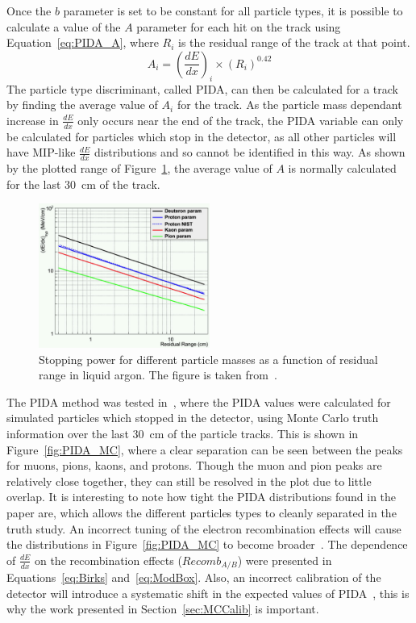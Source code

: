 Once the $b$ parameter is set to be constant for all particle types, it is possible to calculate a value of the $A$ parameter for each hit on the track using Equation~\ref{eq:PIDA_A}, where $R_i$ is the residual range of the track at that point.
\begin{equation}
  \label{eq:PIDA_A}
  A_i = \left(\frac{dE}{dx}\right)_i \times \left(R_{i}\right)^{0.42}
\end{equation}
The particle type discriminant, called PIDA, can then be calculated for a track by finding the average value of $A_i$ for the track. As the particle mass dependant increase in $\frac{dE}{dx}$ only occurs near the end of the track, the PIDA variable can only be calculated for particles which stop in the detector, as all other particles will have MIP-like $\frac{dE}{dx}$ distributions and so cannot be identified in this way. As shown by the plotted range of Figure~\ref{fig:PIDA_loglog}, the average value of $A$ is normally calculated for the last 30~cm of the track. \\

\begin{figure}
  \centering
  \includegraphics[width=0.5\textwidth]{StoppingPower}
  \caption[Stopping power for different particle masses as a function of residual range in liquid argon]
          {Stopping power for different particle masses as a function of residual range in liquid argon. The figure is taken from~\citep{PIDA_Paper}.}
  \label{fig:PIDA_loglog}
\end{figure}

The PIDA method was tested in~\citep{PIDA_Paper}, where the PIDA values were calculated for simulated particles which stopped in the detector, using Monte Carlo truth information over the last 30~cm of the particle tracks. This is shown in Figure~\ref{fig:PIDA_MC}, where a clear separation can be seen between the peaks for muons, pions, kaons, and protons. Though the muon and pion peaks are relatively close together, they can still be resolved in the plot due to little overlap. It is interesting to note how tight the PIDA distributions found in the paper are, which allows the different particles types to cleanly separated in the truth study. An incorrect tuning of the electron recombination effects will cause the distributions in Figure~\ref{fig:PIDA_MC} to become broader~\citep{PIDA_Paper}. The dependence of $\frac{dE}{dx}$ on the recombination effects ($Recomb_{A/B}$) were presented in Equations~\ref{eq:Birks} and~\ref{eq:ModBox}. Also, an incorrect calibration of the detector will introduce a systematic shift in the expected values of PIDA~\citep{PIDA_Paper}, this is why the work presented in Section~\ref{sec:MCCalib} is important. \\

